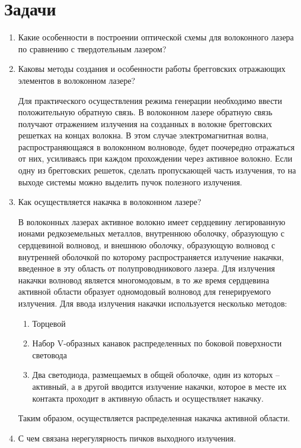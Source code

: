 \documentclass[a4paper, 12pt]{article}
\begin{document}
	\section{Задачи}
	\begin{enumerate}
		\item Какие особенности в построении оптической схемы для волоконного лазера по сравнению с твердотельным лазером?\par
		\item Каковы методы создания и особенности работы брегговских отражающих элементов в волоконном лазере?\par
			Для практического осуществления режима генерации необходимо ввести положительную обратную связь. В волоконном лазере обратную связь получают отражением излучения на созданных в волокне брегговских решетках на концах волокна. В этом случае электромагнитная волна, распространяющаяся в волоконном волноводе, будет поочередно отражаться от них, усиливаясь при каждом прохождении через активное волокно. Если одну из брегговских решеток, сделать пропускающей часть излучения, то на выходе системы можно выделить пучок полезного излучения.
		\item Как осуществляется накачка в волоконном лазере?\par
			В волоконных лазерах активное волокно имеет сердцевину легированную ионами редкоземельных металлов, внутреннюю оболочку, образующую с сердцевиной волновод, и внешнюю оболочку, образующую волновод с внутренней оболочкой по которому распространяется излучение накачки, введенное в эту область от полупроводникового лазера. Для излучения накачки волновод является многомодовым, в то же время сердцевина активной области образует одномодовый волновод для генерируемого излучения. Для ввода излучения накачки используется несколько методов:
			\begin{enumerate}
				\item Торцевой
				\item Набор V-образных канавок распределенных по боковой поверхности световода
				\item Два светодиода, размещаемых в общей оболочке, один из которых – активный, а в другой вводится излучение накачки, которое в месте их контакта проходит в активную область и осуществляет накачку.
			\end{enumerate}
			Таким образом, осуществляется распределенная накачка активной области.
			\item С чем связана нерегулярность пичков выходного излучения.\par

\end{enumerate}
\end{document}
